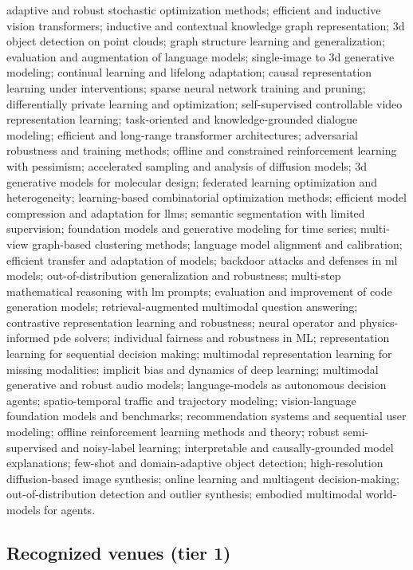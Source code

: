 \documentclass{article} %
\begin{document}
{\small adaptive and robust stochastic optimization methods; efficient and inductive vision transformers; inductive and contextual knowledge graph representation; 3d object detection on point clouds; graph structure learning and generalization; evaluation and augmentation of language models; single-image to 3d generative modeling; continual learning and lifelong adaptation; causal representation learning under interventions; sparse neural network training and pruning; differentially private learning and optimization; self-supervised controllable video representation learning; task-oriented and knowledge-grounded dialogue modeling; efficient and long-range transformer architectures; adversarial robustness and training methods; offline and constrained reinforcement learning with pessimism; accelerated sampling and analysis of diffusion models; 3d generative models for molecular design; federated learning optimization and heterogeneity; learning-based combinatorial optimization methods; efficient model compression and adaptation for llms; semantic segmentation with limited supervision; foundation models and generative modeling for time series; multi-view graph-based clustering methods; language model alignment and calibration; efficient transfer and adaptation of models; backdoor attacks and defenses in ml models; out-of-distribution generalization and robustness; multi-step mathematical reasoning with lm prompts; evaluation and improvement of code generation models; retrieval-augmented multimodal question answering; contrastive representation learning and robustness; neural operator and physics-informed pde solvers; individual fairness and robustness in ML; representation learning for sequential decision making; multimodal representation learning for missing modalities; implicit bias and dynamics of deep learning; multimodal generative and robust audio models; language-models as autonomous decision agents; spatio-temporal traffic and trajectory modeling; vision-language foundation models and benchmarks; recommendation systems and sequential user modeling; offline reinforcement learning methods and theory; robust semi-supervised and noisy-label learning; interpretable and causally-grounded model explanations; few-shot and domain-adaptive object detection; high-resolution diffusion-based image synthesis; online learning and multiagent decision-making; out-of-distribution detection and outlier synthesis; embodied multimodal world-models for agents.}

\subsection{Recognized venues (tier 1)}
\label{app:venues}
\end{document}
